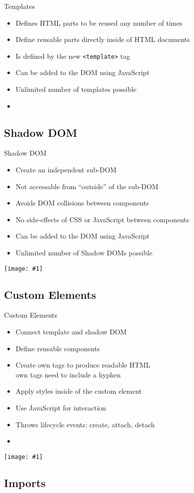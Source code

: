 \documentclass{beamer}
\newcommand{\code}[1]{\texttt{#1}}
\newcommand{\listing}[1]{
	\begin{itemize}
		\item[]
	\end{itemize}
}
\newcommand{\myfig}[2]{
	\begin{minipage}[c]{\textwidth}
		\begin{center}
			\texttt{[image: \#1]}
		\end{center}
		\vspace{3mm}
	\end{minipage}
}
\newcommand{\slideItems}[1]{
	\begin{itemize}
		#1
	\end{itemize}
}
\newcommand{\slide}[2]{
	\begin{frame}{#1}
		#2
	\end{frame}
}
\begin{document}
\slide{Templates}{
	\slideItems{
		\item Defines HTML parts to be reused any number of times
		\item Define reusable parts directly inside of HTML documents
		\item Is defined by the new \code{<template>} tag
		\item Can be added to the DOM using JavaScript
		\item Unlimited number of templates possible
	}
	\listing{template.html}
}

\subsection{Shadow DOM}

\slide{Shadow DOM}{
	\slideItems{
		\item Create an independent sub-DOM
		\item Not accessable from ``outside'' of the sub-DOM
		\item Avoids DOM collisions between components
		\item No side-effects of CSS or JavaScript between components
		\item Can be added to the DOM using JavaScript
		\item Unlimited number of Shadow DOMs possible
	}
	\myfig{shadow_dom.png}{.6}
}

\subsection{Custom Elements}

\slide{Custom Elements}{
	\slideItems{
		\item Connect template and shadow DOM
		\item Define reusable components
		\item Create own tags to produce readable HTML \\ \ding{213} own tags need to include a hyphen
		\item Apply styles inside of the custom element
		\item Use JavaScript for interaction
		\item Throws lifecycle events: create, attach, detach
	}
	\listing{custom_element.html}
	\myfig{custom_element.png}{.5}
}

\subsection{Imports}
\end{document}
